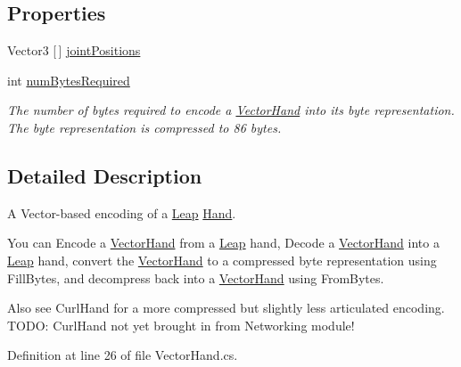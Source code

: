 \subsection*{Properties}
\begin{DoxyCompactItemize}
\item 
Vector3 \mbox{[}$\,$\mbox{]} \mbox{\hyperlink{class_leap_1_1_unity_1_1_encoding_1_1_vector_hand_a2a4a898bdae166029301d43f161609fc}{joint\+Positions}}
\item 
int \mbox{\hyperlink{class_leap_1_1_unity_1_1_encoding_1_1_vector_hand_a43a43bf6a938dda526d2114392447bba}{num\+Bytes\+Required}}
\begin{DoxyCompactList}\small\item\em The number of bytes required to encode a \mbox{\hyperlink{class_leap_1_1_unity_1_1_encoding_1_1_vector_hand}{Vector\+Hand}} into its byte representation. The byte representation is compressed to 86 bytes. \end{DoxyCompactList}\end{DoxyCompactItemize}


\subsection{Detailed Description}
A Vector-\/based encoding of a \mbox{\hyperlink{namespace_leap_1_1_unity_1_1_leap}{Leap}} \mbox{\hyperlink{class_leap_1_1_hand}{Hand}}. 

You can Encode a \mbox{\hyperlink{class_leap_1_1_unity_1_1_encoding_1_1_vector_hand}{Vector\+Hand}} from a \mbox{\hyperlink{namespace_leap_1_1_unity_1_1_leap}{Leap}} hand, Decode a \mbox{\hyperlink{class_leap_1_1_unity_1_1_encoding_1_1_vector_hand}{Vector\+Hand}} into a \mbox{\hyperlink{namespace_leap_1_1_unity_1_1_leap}{Leap}} hand, convert the \mbox{\hyperlink{class_leap_1_1_unity_1_1_encoding_1_1_vector_hand}{Vector\+Hand}} to a compressed byte representation using Fill\+Bytes, and decompress back into a \mbox{\hyperlink{class_leap_1_1_unity_1_1_encoding_1_1_vector_hand}{Vector\+Hand}} using From\+Bytes.

Also see Curl\+Hand for a more compressed but slightly less articulated encoding. T\+O\+DO\+: Curl\+Hand not yet brought in from Networking module! 

Definition at line 26 of file Vector\+Hand.\+cs.



